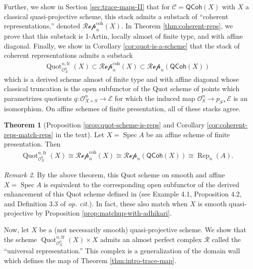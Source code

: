 \documentclass{article}
\numberwithin{equation}{section}
\theoremstyle{quest}
\theoremstyle{definition}
\newtheorem{thm}{Theorem}[section]
\theoremstyle{remark}
\newtheorem{rmk}[thm]{Remark}
\DeclareMathOperator{\Spec}{Spec}
\DeclareMathOperator{\Rep}{Rep}
\DeclareMathOperator{\Quot}{Quot}
\begin{document}
Further, we show in Section \ref{sec:trace-maps-II} that for $\mathcal{C}=\mathsf{QCoh}(X)$ with $X$ a classical quasi-projective scheme, this stack admits a substack of ``coherent representations,'' denoted $\mathscr{Rep}_n^{\text{coh}}(X)$. In Theorem \ref{thm:coherent-reps}, we prove that this substack is 1-Artin, locally almost of finite type, and with affine diagonal. Finally, we show in Corollary \ref{cor:quot-is-a-scheme} that the stack of coherent representations admits a substack 
\begin{align*}
	\Quot^{n,\text{fr}}_{\mathscr{O}^n_X}(X)\subset \mathscr{Rep}_n^{\text{coh}}(X)\subset \mathscr{Rep}_n(\mathsf{QCoh}(X))
\end{align*} 
which is a derived scheme almost of finite type and with affine diagonal whose classical truncation is the open subfunctor of the Quot scheme of points which parametrizes quotients $q: \mathscr{O}^n_{X\times S}\to \mathscr{E}$ for which the induced map $\mathscr{O}^n_S\to p_{S*}\mathscr{E}$ is an isomorphism.  On affine schemes of finite presentation, all of these stacks agree.
\begin{thm}[Proposition \ref{prop:quot-scheme-is-reps} and Corollary \ref{cor:coherent-reps-match-reps} in the text]\label{thm:intro-affine-reps-all-agree}
Let $X=\Spec A$ be an affine scheme of finite presentation. Then
\begin{align*}
	\Quot^{n,\text{fr}}_{\mathscr{O}_X^n}(X)\cong \mathscr{Rep}_n^{\text{coh}}(X)\cong \mathscr{Rep}_n(\mathsf{QCoh}(X))\cong\Rep_n(A).
\end{align*} 
\end{thm} 
\begin{rmk}
	 By the above theorem, this Quot scheme on smooth and affine $X=\Spec A$ is equivalent to the corresponding open subfunctor of the derived enhancement of this Quot scheme defined in \cite{quot} (see Example 4.1, Proposition 4.2, and Definition 3.3 of \textit{op. cit.}). In fact, these also match when $X$ is smooth quasi-projective by Proposition \ref{prop:matchup-with-adhikari}.
\end{rmk} 
Now, let $X$ be a (not necessarily smooth) quasi-projective scheme. We show that the scheme $\Quot^{n,\text{fr}}_{\mathscr{O}^n_X}(X) \times X$ admits an almost perfect complex $\mathscr{R}$ called the ``universal representation.'' This complex is a generalization of the domain wall which defines the map of Theorem \ref{thm:intro-trace-map}.
\end{document}

